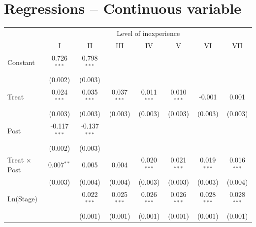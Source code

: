\documentclass[
]{article}
\begin{document}
\hypertarget{regressions-continuous-variable}{%
\section{Regressions -- Continuous
variable}\label{regressions-continuous-variable}}

\begingroup
\centering
\small
\begin{tabular}{lccccccc}
   \toprule
    & \multicolumn{7}{c}{Level of inexperience}\\
                                       & I              & II             & III           & IV            & V             & VI            & VII\\  
   Constant                            & 0.726$^{***}$  & 0.798$^{***}$  &               &               &               &               &   \\   
                                       & (0.002)        & (0.003)        &               &               &               &               &   \\   
   Treat                               & 0.024$^{***}$  & 0.035$^{***}$  & 0.037$^{***}$ & 0.011$^{***}$ & 0.010$^{***}$ & -0.001        & 0.001\\   
                                       & (0.003)        & (0.003)        & (0.003)       & (0.003)       & (0.003)       & (0.003)       & (0.003)\\   
   Post                                & -0.117$^{***}$ & -0.137$^{***}$ &               &               &               &               &   \\   
                                       & (0.002)        & (0.003)        &               &               &               &               &   \\   
   Treat $\times$ Post                 & 0.007$^{**}$   & 0.005          & 0.004         & 0.020$^{***}$ & 0.021$^{***}$ & 0.019$^{***}$ & 0.016$^{***}$\\   
                                       & (0.003)        & (0.004)        & (0.004)       & (0.003)       & (0.003)       & (0.003)       & (0.004)\\   
   Ln(Stage)                           &                & 0.022$^{***}$  & 0.025$^{***}$ & 0.026$^{***}$ & 0.026$^{***}$ & 0.028$^{***}$ & 0.028$^{***}$\\   
                                       &                & (0.001)        & (0.001)       & (0.001)       & (0.001)       & (0.001)       & (0.001)\\   

\end{tabular}
\end{document}
